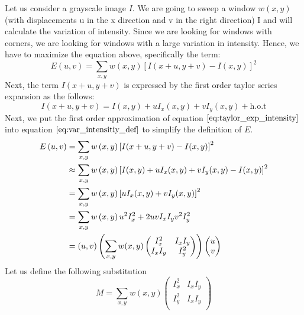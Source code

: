 Let us consider a grayscale image $I$. We are going to sweep a window $w(x,y)$ (with displacements u in the x direction and v in the right direction) I and will calculate the variation of intensity. Since we are looking for windows with corners, we are looking for windows with a large variation in intensity. Hence, we have to maximize the equation above, specifically the term:
\begin{equation}
	E \left( u, v \right) = \sum_{x,y} w \left( x,y \right) \left[ I(x + u, y + v) - I(x, y) \right]^2
\label{eq:var_intensitiy_def}
\end{equation}
Next, the term $I(x + u, y + v)$ is expressed by the first order taylor series expansion as the follows:
\begin{equation}
	I(x + u, y + v) = I(x,y) + u I_x (x, y) + v I_y (x,y) + \text{h.o.t}
\label{eq:taylor_exp_intensity}
\end{equation}
Next, we put the first order approximation of equation $\ref{eq:taylor_exp_intensity}$ into equation $\ref{eq:var_intensitiy_def}$ to simplify the definition of $E$.
\begin{equation}
\begin{aligned}
E \left( u, v \right) 
&= \sum_{x,y} w \left( x,y \right) \left[ I(x + u, y + v) - I(x, y) \right]^2 \\
&\approx \sum_{x,y} w \left( x,y \right) \left[ I(x,y) + u I_x (x, y) + v I_y (x,y) - I(x, y) \right]^2 \\
&= \sum_{x,y} w \left( x,y \right) \left[ u I_x (x, y) + v I_y (x,y) \right]^2 \\
&= \sum_{x,y} w \left( x,y \right) u^2 I_x^2 + 2 u v I_x I_y v^2 I_y^2 \\
&= \left( u,v \right) \left( \sum_{x,y} w (x,y)
\begin{pmatrix}
I_x^2 & I_x I_y \\
I_x I_y & I_y^2 \\
\end{pmatrix}
\right) \colvec{u}{v}
\end{aligned}
\label{eq:var_intensitiy_developed}
\end{equation}
Let us define the following substitution
\begin{equation}
M = \sum_{x,y} w  (x,y)
\begin{pmatrix}
I_x^2 & I_x I_y \\
I_y^2 & I_x I_y \\
\end{pmatrix}
\label{eq:var_intensity_sub}
\end{equation}
